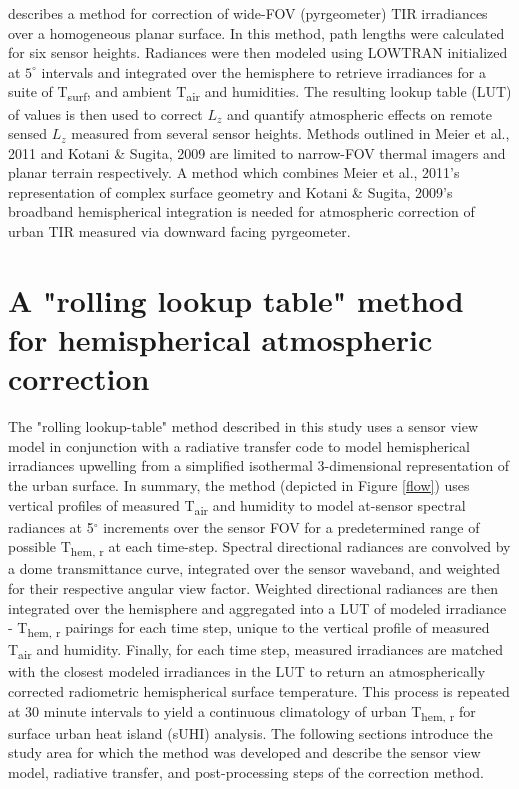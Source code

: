 \citet{Kotani2009a} describes a method for correction of wide-FOV (pyrgeometer) TIR irradiances over a homogeneous planar surface. In this method, path lengths were calculated for six sensor heights. Radiances were then modeled using LOWTRAN initialized at $5^{\circ}$ intervals and integrated over the hemisphere to retrieve irradiances for a suite of T\textsubscript{surf}, and ambient T\textsubscript{air} and humidities. The resulting lookup table (LUT) of values is then used to correct $L_z$ and quantify atmospheric effects on remote sensed $L_z$ measured from several sensor heights. Methods outlined in Meier et al., 2011 and Kotani \& Sugita, 2009 are limited to narrow-FOV thermal imagers and planar terrain respectively. A method which combines Meier et al., 2011's representation of complex surface geometry and Kotani \& Sugita, 2009's broadband hemispherical integration is needed for atmospheric correction of urban TIR measured via downward facing pyrgeometer.

\section{A "rolling lookup table" method for hemispherical atmospheric correction}


The "rolling lookup-table" method described in this study uses a sensor view model in conjunction with a radiative transfer code to model hemispherical irradiances upwelling from a simplified isothermal 3-dimensional representation of the urban surface. In summary, the method (depicted in Figure \ref{flow}) uses vertical profiles of measured T\textsubscript{air} and humidity to model at-sensor spectral radiances at 5$^{\circ}$ increments over the sensor FOV for a predetermined range of possible T\textsubscript{hem, r} at each time-step. Spectral directional radiances are convolved by a dome transmittance curve, integrated over the sensor waveband, and weighted for their respective angular view factor. Weighted directional radiances are then integrated over the hemisphere and aggregated into a LUT of modeled irradiance - T\textsubscript{hem, r} pairings for each time step, unique to the vertical profile of measured T\textsubscript{air} and humidity. Finally, for each time step, measured irradiances are matched with the closest modeled irradiances in the LUT to return an atmospherically corrected radiometric hemispherical surface temperature. This process is repeated at 30 minute intervals to yield a continuous climatology of urban T\textsubscript{hem, r} for surface urban heat island (sUHI) analysis. The following sections introduce the study area for which the method was developed and describe the sensor view model, radiative transfer, and post-processing steps of the correction method.

